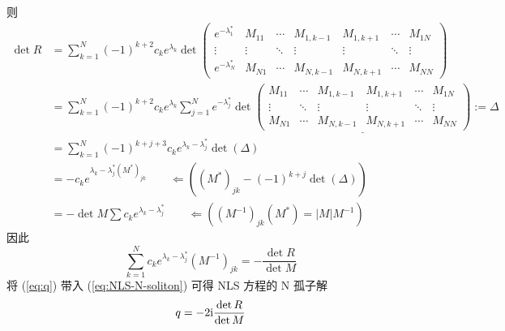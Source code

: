 则 
\begin{equation}
  \begin{aligned}
    \det R &= \sum_{k=1}^{N}(-1)^{k+2} c_{k} e^{\lambda_{k}} \det \begin{pmatrix}
      e^{-\lambda_{1}^{*}} & M_{11} & \cdots & M_{1,k-1} & M_{1,k+1} & \cdots & M_{1N} \\
      \vdots & \vdots & \ddots & \vdots & \vdots & \ddots & \vdots \\
      e^{-\lambda_{N}^{*}} & M_{N1} & \cdots & M_{N,k-1} & M_{N,k+1} & \cdots & M_{NN}
    \end{pmatrix} \\
    &= \sum_{k=1}^{N} (-1)^{k+2} c_{k} e^{\lambda_{k}} \sum_{j=1}^{N} e^{-\lambda_{j}^{*}} \det \underline{\begin{pmatrix}
      M_{11} & \cdots & M_{1,k-1} & M_{1,k+1} & \cdots & M_{1N} \\
      \vdots & \ddots & \vdots & \vdots & \ddots & \vdots \\
      M_{N1} & \cdots & M_{N,k-1} & M_{N,k+1} & \cdots & M_{NN}
    \end{pmatrix}} := \Delta \\
    &= \sum_{k=1}^{N}(-1)^{k+j+3}c_{k} e^{\lambda_{k} - \lambda_{j}^{*}} \det(\Delta) \\
    &= -c_{k} e^{\lambda_{k} - \lambda_{j}^{*} (M^{*})_{jk}} \qquad \Leftarrow \left((M^{*})_{jk} - (-1)^{k+j} \det(\Delta) \right) \\
    &= -\det M \sum c_{k}e^{\lambda_{k} - \lambda_{j}^{*}} \qquad \Leftarrow \left( (M^{-1})_{jk} (M^{*}) = |M| M^{-1} \right)
  \end{aligned}
\end{equation}
因此 
\begin{equation}
  \sum_{k=1}^{N} c_{k} e^{\lambda_{k} - \lambda_{j}^{*}}(M^{-1})_{jk} = - \frac{\det R}{\det M} \label{eq:q}
\end{equation}
将 (\ref{eq:q}) 带入 (\ref{eq:NLS-N-soliton}) 可得 NLS 方程的 N 孤子解
\begin{equation}
  q = -2 \mathrm{i} \frac{\det R}{ \det M}
\end{equation}